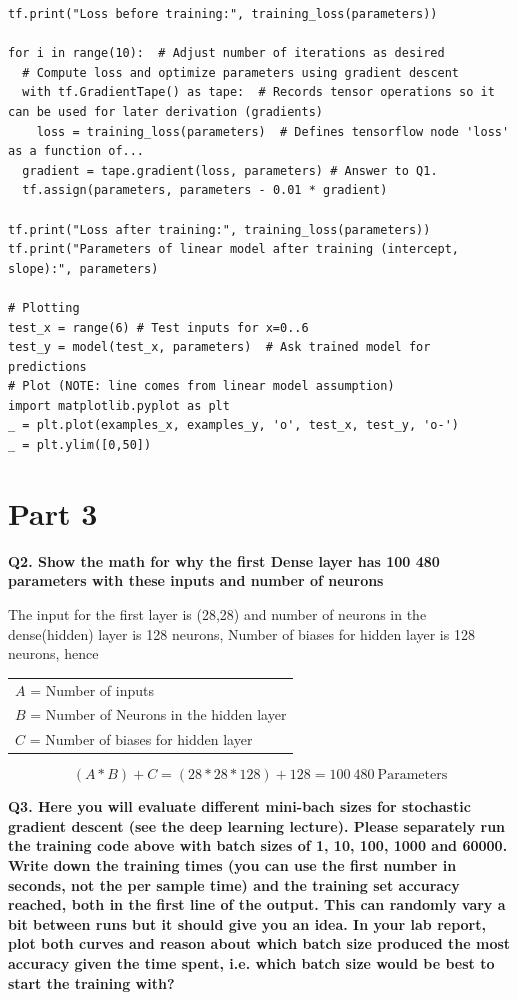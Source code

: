 \documentclass[a4paper,10pt]{article}
\begin{document}
\begin{lstlisting}
tf.print("Loss before training:", training_loss(parameters))

for i in range(10):  # Adjust number of iterations as desired
  # Compute loss and optimize parameters using gradient descent
  with tf.GradientTape() as tape:  # Records tensor operations so it can be used for later derivation (gradients)
    loss = training_loss(parameters)  # Defines tensorflow node 'loss' as a function of...
  gradient = tape.gradient(loss, parameters) # Answer to Q1.
  tf.assign(parameters, parameters - 0.01 * gradient)   

tf.print("Loss after training:", training_loss(parameters))
tf.print("Parameters of linear model after training (intercept, slope):", parameters)

# Plotting
test_x = range(6) # Test inputs for x=0..6
test_y = model(test_x, parameters)  # Ask trained model for predictions
# Plot (NOTE: line comes from linear model assumption)
import matplotlib.pyplot as plt
_ = plt.plot(examples_x, examples_y, 'o', test_x, test_y, 'o-')
_ = plt.ylim([0,50])

\end{lstlisting}

\section*{Part 3}

\textbf{Q2. Show the math for why the first Dense layer has 100 480 parameters with these inputs and number of neurons}

The input for the first layer is (28,28) and number of neurons in the dense(hidden) layer is 128 neurons,
Number of biases for hidden layer is 128 neurons, hence
\begin{center}
	\begin{tabular}{l}
		$A$ = Number of inputs \\
		$B$ = Number of Neurons in the hidden layer \\
		$C$ = Number of biases for hidden layer \\
	\end{tabular}
\end{center}
\begin{equation*}
	(A * B) + C = (28*28*128)+128 = 100~480~\text{Parameters}
\end{equation*}


\textbf{Q3. Here you will evaluate different mini-bach sizes for stochastic gradient descent (see the deep learning lecture). 
Please separately run the training code above with batch sizes of 1, 10, 100, 1000 and 60000. 
Write down the training times (you can use the first number in seconds, not the per sample time) and 
the training set accuracy reached, both in the first line of the output. 
This can randomly vary a bit between runs but it should give you an idea. 
In your lab report, plot both curves and reason about which batch size produced the most accuracy 
given the time spent, i.e. which batch size would be best to start the training with?}
\end{document}
